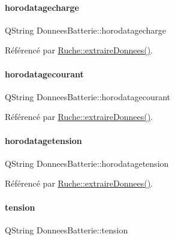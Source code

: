 \paragraph{\texorpdfstring{horodatagecharge}{horodatagecharge}}
{\footnotesize\ttfamily Q\+String Donnees\+Batterie\+::horodatagecharge}



Référencé par \hyperlink{class_ruche_a21c0dafeaec03d451590037343e6a3ca}{Ruche\+::extraire\+Donnees()}.

\mbox{\label{struct_donnees_batterie_a1318c296d4e6926304851a7cef0ad957}} 
\paragraph{\texorpdfstring{horodatagecourant}{horodatagecourant}}
{\footnotesize\ttfamily Q\+String Donnees\+Batterie\+::horodatagecourant}



Référencé par \hyperlink{class_ruche_a21c0dafeaec03d451590037343e6a3ca}{Ruche\+::extraire\+Donnees()}.

\mbox{\label{struct_donnees_batterie_ac19dd5bb96d677e228ddd22159076d26}} 
\paragraph{\texorpdfstring{horodatagetension}{horodatagetension}}
{\footnotesize\ttfamily Q\+String Donnees\+Batterie\+::horodatagetension}



Référencé par \hyperlink{class_ruche_a21c0dafeaec03d451590037343e6a3ca}{Ruche\+::extraire\+Donnees()}.

\mbox{\label{struct_donnees_batterie_a1394510ba159a846820452e9e333f38b}} 
\paragraph{\texorpdfstring{tension}{tension}}
{\footnotesize\ttfamily Q\+String Donnees\+Batterie\+::tension}



